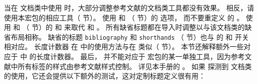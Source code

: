 
当在  文档类中使用 \biblatex 时，大部分调整参考文献的文档类工具都没有效果。
相反，请使用本宏包的相应工具（ 节）。
使用  和 （ 节）的  选项，
而不要重定义  的 。
使用  和 （ 节）的  和  来取代  和 。
所有缺省标题都在导入时调整以与该文档类的缺省布局相称。
缺省的标题 \texttt{bibliography} 和 \texttt{shorthands} （ 节）也与  的  和  开关相对应。
长度计数器  在 \biblatex 中的使用方法与在  类似（ 节）。
本节还解释额外一些对应于  中  的长度计数器。
最后， 并不能对应于 \biblatex 宏包的某一单独工具，因为参考文献中所有标签的样式由参考文献样式控制。
详见本手册的 。
如果 \biblatex 探测到  文档类的使用，它还会提供以下额外的测试，这对定制标题定义很有用：

